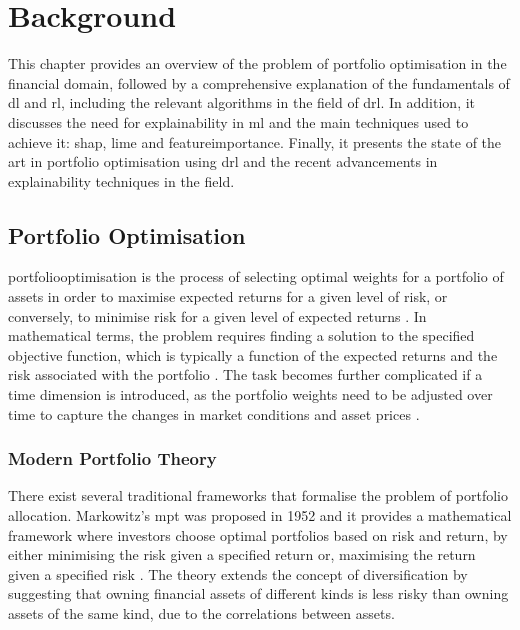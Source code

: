 \chapter{Background} \label{ch:background}

This chapter provides an overview of the problem of portfolio optimisation in the financial domain, followed by a comprehensive explanation of the fundamentals of \acrfull{dl} and \acrfull{rl}, including the relevant algorithms in the field of \acrfull{drl}. In addition, it discusses the need for explainability in \acrfull{ml} and the main techniques used to achieve it: \acrfull{shap}, \acrfull{lime} and \Gls{featureimportance}. Finally, it presents the state of the art in portfolio optimisation using \acrshort{drl} and the recent advancements in explainability techniques in the field. 

\section{Portfolio Optimisation} \label{sec:portfoliooptimisation}

\Gls{portfoliooptimisation} is the process of selecting optimal weights for a portfolio of assets in order to maximise expected returns for a given level of risk, or conversely, to minimise risk for a given level of expected returns \cite{Sato2019}. In mathematical terms, the problem requires finding a solution to the specified objective function, which is typically a function of the expected returns and the risk associated with the portfolio \cite{Bruce2014}. The task becomes further complicated if a time dimension is introduced, as the portfolio weights need to be adjusted over time to capture the changes in market conditions and asset prices \cite{Li2019}. 

\subsection{Modern Portfolio Theory}

There exist several traditional frameworks that formalise the problem of portfolio allocation. Markowitz's \acrfull{mpt} was proposed in 1952 \cite{Markowitz1952} and it provides a mathematical framework where investors choose optimal portfolios based on risk and return, by either minimising the risk given a specified return or, maximising the return given a specified risk \cite{kent}. The theory extends the concept of diversification by suggesting that owning financial assets of different kinds is less risky than owning assets of the same kind, due to the correlations between assets. 

